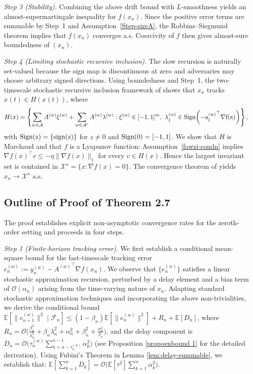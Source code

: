 \documentclass{article}
\DeclareMathOperator*{\sign}{sign}
\newcommand{\Sign}{\rm Sign}
\newcommand{\cA}{\mathcal{A}}
\begin{document}
\emph{Step 3 (Stability).}
Combining the above drift bound with $L$-smoothness yields an
almost-supermartingale inequality for $f(x_n)$. Since the positive error terms
are summable by Step~1 and Assumption~\ref{Step-sizeA}, the
Robbins--Siegmund theorem \citep{robbins1971convergence} implies that
$f(x_n)$ converges a.s. Coercivity of $f$ then gives almost-sure boundedness of
$(x_n)$.

\emph{Step 4 (Limiting stochastic recursive inclusion).}
The slow recursion is naturally set-valued because the sign map is
discontinuous at zero and adversaries may choose arbitrary signed directions.
Using boundedness and Step~1, the two-timescale stochastic recursive inclusion
framework of \citet{yaji2020stochastic} shows that $x_n$ tracks
$\dot x(t)\in H(x(t))$, where
\[
H(x)
=
\left\{
\sum_{w\in\cA}A^{(w)}\xi^{(w)}
+
\sum_{w\in\cA^c}A^{(w)}\lambda^{(w)}
:
\xi^{(w)}\in[-1,1]^m,\ 
\lambda_j^{(w)}\in\Sign\!\left(-{a_j^{(w)}}^\top\nabla f(x)\right)
\right\},
\]
with $\Sign(z)=\{\sign(z)\}$ for $z\neq0$ and $\Sign(0)=[-1,1]$. We show that
$H$ is Marchaud and that $f$ is a Lyapunov function: Assumption~\ref{fawzi-condn}
implies $\nabla f(x)^\top v\le-\eta\|\nabla f(x)\|_1$ for every $v\in H(x)$.
Hence the largest invariant set is contained in
$\mathcal X^\star=\{x:\nabla f(x)=0\}$. The convergence theorem of
\citet{yaji2020stochastic} yields $x_n\to\mathcal X^\star$ a.s.

\subsection{ Outline of Proof of Theorem 2.7}
The proof establishes explicit non-asymptotic convergence rates for the zeroth-order setting and proceeds in four steps.

\emph{Step 1 (Finite-horizon tracking error)}. We first establish a conditional mean-square bound for the fast-timescale tracking error $e_n^{(w)} := y_n^{(w)} - {A^{(w)}}^\top \nabla f(x_n)$. We observe that $\{e_n^{(w)} \}$ satisfies a linear stochastic approximation recursion, perturbed by a delay element and a bias term of $\mathcal{O}(\alpha_n)$ arising from the time-varying nature of $x_n$. Adapting standard stochastic approximation techniques and  incorporating the above non-trivialities, we derive the conditional bound $\mathbb{E}[\|e_{n+1}^{(w)}\|^2 \mid \mathcal{F}_n] \le (1-\beta_n) \mathbb{E}[\|e_n^{(w)}\|^2] + R_n + \mathbb{E}[D_n]$, where $R_n = \mathcal{O}\big(\frac{\beta_n^2}{\lambda_n^2} + \beta_n \lambda_n^2 + \alpha_n^2 + \beta_n^2 + \frac{\alpha_n^2}{\beta_n}\big)$, and the delay component is $D_n = \mathcal{O}\big(\tau_n^{(w)} \sum_{k=n-\tau_n^{(w)}}^{n-1} \alpha_k^2\big)$ (see Proposition \ref{propoenbound 1} for the detailed derivation). Using Fubini's Theorem in Lemma \ref{lem:delay-summable}, we establish that: $\mathbb{E}[\sum_{k=1}^{n} D_k] = \mathcal{O} \big(\mathbb{E}[\tau^2]\sum_{k=1}^{n} \alpha_k^2\big)$.
\end{document}
